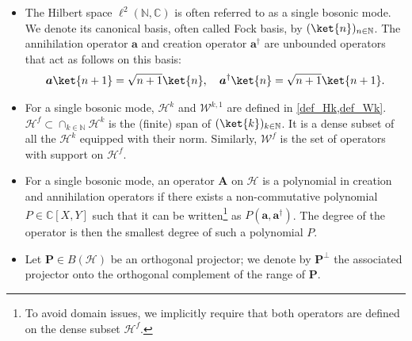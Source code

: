 \documentclass{article}
\newcommand{\C}{\mathbb{C}}
\newcommand{\xH}{\mathcal{H}}
\newcommand{\xN}{\mathbb{N}}
\newcommand{\xW}{\mathcal{W}}
\let\bf\boldsymbol
\newcommand{\oa}{{\bf a}}
\newcommand{\oP}{{\bf P}}
\newcommand{\oA}{{\bf A}}
\begin{document}
\begin{itemize}
    \item The Hilbert space $\ell^2(\xN,\C)$ is often referred to as a single bosonic mode. We denote its canonical basis, often called Fock basis, by $(\ket{n})_{n\in \xN}$. The annihilation operator $\oa$ and creation operator $\oa^\dag$ are unbounded operators that act as follows on this basis:
	\begin{align}
		\oa\ket{n+1}=\sqrt{n+1}\ket{n},\quad \oa^\dag \ket{n}=\sqrt{n+1}\ket{n+1}.
	\end{align}
    \item For a single bosonic mode, $\xH^k$ and $\xW^{k,1}$ are defined in \cref{def_Hk,def_Wk}. $\xH^f\subset \cap_{k \in \xN} \xH^k$ is the (finite) span of $(\ket{k})_{k \in \xN}$. It is a dense subset of all the $\xH^k$ equipped with their norm. Similarly, $\xW^f$ is the set of operators with support on $\xH^f$.
    \item For a single bosonic mode, an operator $\oA$ on $\xH$ is a polynomial in creation and annihilation operators if there exists a non-commutative polynomial $P\in \C[X,Y]$ such that it can be written\footnote{To avoid domain issues, we implicitly require that both operators are defined on the dense subset $\xH^f$.} as $P(\oa,\oa^\dag)$. The degree of the operator is then the smallest degree of such a polynomial $P$. 
    \item Let $\oP\in B(\xH)$ be an orthogonal projector; we denote by $\oP^\perp$ the associated projector onto the orthogonal complement of the range of $\oP$.
\end{itemize}
\vspace{1em}
\printbibliography
\end{document}

